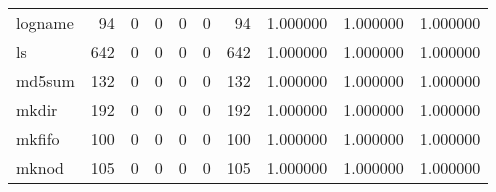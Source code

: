 \begin{tabular}{lrrrrrrrrr}
logname   &                                                 94 &                                                  0 &                                                  0 &                                                  0 &                                                  0 &                                                 94 &                                           1.000000 &                               1.000000 &                             1.000000 \\
ls        &                                                642 &                                                  0 &                                                  0 &                                                  0 &                                                  0 &                                                642 &                                           1.000000 &                               1.000000 &                             1.000000 \\
md5sum    &                                                132 &                                                  0 &                                                  0 &                                                  0 &                                                  0 &                                                132 &                                           1.000000 &                               1.000000 &                             1.000000 \\
mkdir     &                                                192 &                                                  0 &                                                  0 &                                                  0 &                                                  0 &                                                192 &                                           1.000000 &                               1.000000 &                             1.000000 \\
mkfifo    &                                                100 &                                                  0 &                                                  0 &                                                  0 &                                                  0 &                                                100 &                                           1.000000 &                               1.000000 &                             1.000000 \\
mknod     &                                                105 &                                                  0 &                                                  0 &                                                  0 &                                                  0 &                                                105 &                                           1.000000 &                               1.000000 &                             1.000000 \\

\end{tabular}
